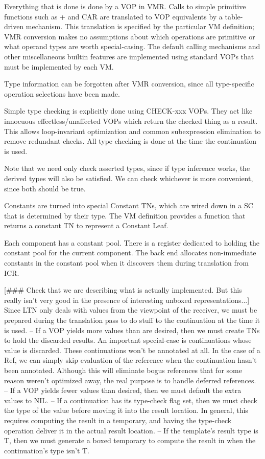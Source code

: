 Everything that is done is done by a VOP in VMR.  Calls to simple primitive
functions such as + and CAR are translated to VOP equivalents by a table-driven
mechanism.  This translation is specified by the particular VM definition; VMR
conversion makes no assumptions about which operations are primitive or what
operand types are worth special-casing.  The default calling mechanisms and
other miscellaneous builtin features are implemented using standard VOPs that
must be implemented by each VM.

Type information can be forgotten after VMR conversion, since all type-specific
operation selections have been made.

Simple type checking is explicitly done using CHECK-xxx VOPs.  They act like
innocuous effectless/unaffected VOPs which return the checked thing as a
result.  This allows loop-invariant optimization and common subexpression
elimination to remove redundant checks.  All type checking is done at the time
the continuation is used.

Note that we need only check asserted types, since if type inference works, the
derived types will also be satisfied.  We can check whichever is more
convenient, since both should be true.

Constants are turned into special Constant TNs, which are wired down in a SC
that is determined by their type.  The VM definition provides a function that
returns a constant TN to represent a Constant Leaf. 

Each component has a constant pool.  There is a register dedicated to holding
the constant pool for the current component.  The back end allocates
non-immediate constants in the constant pool when it discovers them during
translation from ICR.

[\#\#\# Check that we are describing what is actually implemented.  But this
really isn't very good in the presence of interesting unboxed
representations...] 
Since LTN only deals with values from the viewpoint of the receiver, we must be
prepared during the translation pass to do stuff to the continuation at the
time it is used.
 -- If a VOP yields more values than are desired, then we must create TNs to
    hold the discarded results.  An important special-case is continuations
    whose value is discarded.  These continuations won't be annotated at all.
    In the case of a Ref, we can simply skip evaluation of the reference when
    the continuation hasn't been annotated.  Although this will eliminate
    bogus references that for some reason weren't optimized away, the real
    purpose is to handle deferred references.
 -- If a VOP yields fewer values than desired, then we must default the extra
    values to NIL.
 -- If a continuation has its type-check flag set, then we must check the type
    of the value before moving it into the result location.  In general, this
    requires computing the result in a temporary, and having the type-check
    operation deliver it in the actual result location.
 -- If the template's result type is T, then we must generate a boxed
    temporary to compute the result in when the continuation's type isn't T.


